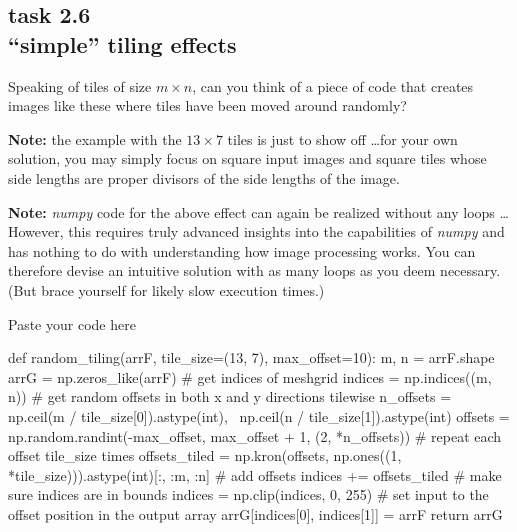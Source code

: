 
\subsection*{task 2.6 \\[1ex] ``simple'' tiling effects}

Speaking of tiles of size $m \times n$, can you think of a piece of code that creates images like these where tiles have been moved around randomly? 
\begin{figure}[h!]
 \hfill
{} \hfill
{} \hfill
{} \hfill
\end{figure}

\textbf{Note:} the example with the $13 \times 7$ tiles is just to show off \ldots for your own solution, you may simply focus on square input images and square tiles whose side lengths are proper divisors of the side lengths of the image.

\textbf{Note:} \emph{numpy} code for the above effect can again be realized without any  loops \ldots However, this requires truly advanced insights into the capabilities of \emph{numpy} and has nothing to do with understanding how image processing works. You can therefore devise an intuitive solution with as many  loops as you deem necessary. (But brace yourself for likely slow execution times.)

Paste your code here %
\begin{python}
def random_tiling(arrF, tile_size=(13, 7), max_offset=10):
    m, n = arrF.shape
    arrG = np.zeros_like(arrF)
    # get indices of meshgrid
    indices = np.indices((m, n))
    # get random offsets in both x and y directions tilewise
    n_offsets = np.ceil(m / tile_size[0]).astype(int), \
                np.ceil(n / tile_size[1]).astype(int)
    offsets = np.random.randint(-max_offset, max_offset + 1,
                                (2, *n_offsets))
    # repeat each offset tile_size times
    offsets_tiled = np.kron(offsets, np.ones((1, *tile_size))).astype(int)[:, :m, :n]
    # add offsets
    indices += offsets_tiled
    # make sure indices are in bounds
    indices = np.clip(indices, 0, 255)
    # set input to the offset position in the output array
    arrG[indices[0], indices[1]] = arrF
    return arrG
\end{python}
